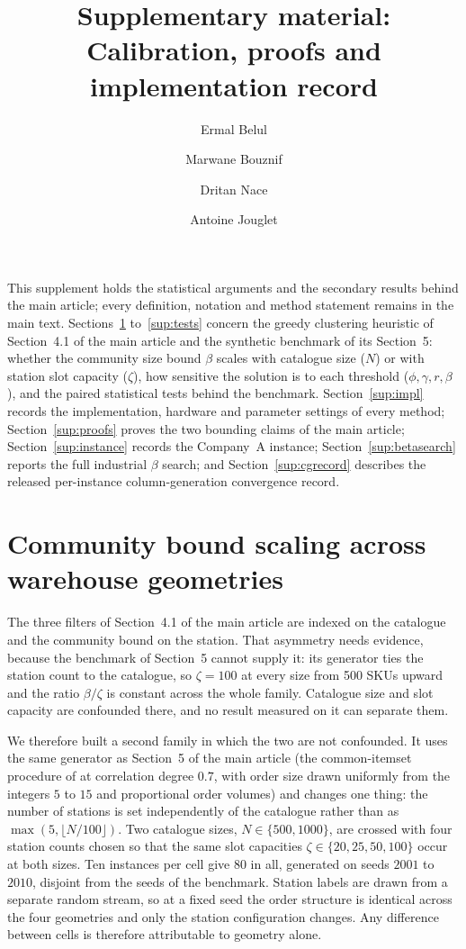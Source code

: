 \documentclass[11pt]{article}
\title{Supplementary material:\\
Calibration, proofs and implementation record}
\author{Ermal Belul \and Marwane Bouznif \and Dritan Nace \and Antoine Jouglet}
\date{}
\begin{document}
\maketitle

\noindent
This supplement holds the statistical arguments and the secondary results behind the main
article; every definition, notation and method statement remains in the main text.
Sections~\ref{sup:capsweep} to~\ref{sup:tests} concern the greedy clustering heuristic of
Section~4.1 of the main article and the synthetic benchmark of its Section~5: whether the
community size bound $\beta$ scales with catalogue size ($N$) or with station slot capacity
($\zeta$), how sensitive the solution is to each threshold ($\phi, \gamma, r, \beta$), and the
paired statistical tests behind the benchmark. Section~\ref{sup:impl} records the
implementation, hardware and parameter settings of every method; Section~\ref{sup:proofs}
proves the two bounding claims of the main article; Section~\ref{sup:instance} records the
Company~A instance; Section~\ref{sup:betasearch} reports the full industrial $\beta$ search; and
Section~\ref{sup:cgrecord} describes the released per-instance column-generation convergence
record.

\section{Community bound scaling across warehouse geometries}\label{sup:capsweep}
The three filters of Section~4.1 of the main article are indexed on the catalogue and the
community bound on the station. That asymmetry needs evidence, because the benchmark of
Section~5 cannot supply it: its generator ties the station count to the catalogue, so
$\zeta=100$ at every size from 500 SKUs upward and the ratio $\beta/\zeta$ is constant across
the whole family. Catalogue size and slot capacity are confounded there, and no result measured
on it can separate them.

We therefore built a second family in which the two are not confounded. It uses the same
generator as Section~5 of the main article (the common-itemset procedure of
\citet{zhang2019cie} at correlation degree $0.7$, with order size drawn uniformly from the integers $5$ to $15$ and
proportional order volumes) and changes one thing: the number of stations is set independently
of the catalogue rather than as $\max(5,\lfloor N/100\rfloor)$. Two catalogue sizes,
$N\in\{500,1000\}$, are crossed with four station counts chosen so that the same slot
capacities $\zeta\in\{20,25,50,100\}$ occur at both sizes. Ten instances per cell give 80 in
all, generated on seeds $2001$ to $2010$, disjoint from the seeds of the benchmark. Station
labels are drawn from a separate random stream, so at a fixed seed the order structure is
identical across the four geometries and only the station configuration changes. Any difference
between cells is therefore attributable to geometry alone.
\end{document}
